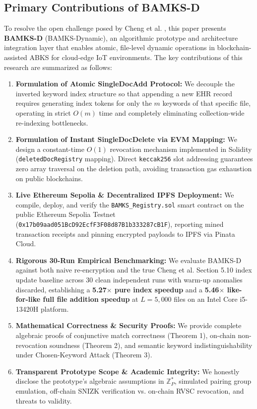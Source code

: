 \documentclass[journal,10pt,twocolumn]{IEEEtran}
\begin{document}
\subsection{Primary Contributions of BAMKS-D}
To resolve the open challenge posed by Cheng et al. \cite{cheng2026bamks}, this paper presents \textbf{BAMKS-D} (BAMKS-Dynamic), an algorithmic prototype and architecture integration layer that enables atomic, file-level dynamic operations in blockchain-assisted ABKS for cloud-edge IoT environments. The key contributions of this research are summarized as follows:
\begin{enumerate}
    \item \textbf{Formulation of Atomic SingleDocAdd Protocol:} We decouple the inverted keyword index structure so that appending a new EHR record requires generating index tokens for only the $m$ keywords of that specific file, operating in strict $O(m)$ time and completely eliminating collection-wide re-indexing bottlenecks.
    \item \textbf{Formulation of Instant SingleDocDelete via EVM Mapping:} We design a constant-time $O(1)$ revocation mechanism implemented in Solidity (\texttt{deletedDocRegistry} mapping). Direct \texttt{keccak256} slot addressing guarantees zero array traversal on the deletion path, avoiding transaction gas exhaustion on public blockchains.
    \item \textbf{Live Ethereum Sepolia \& Decentralized IPFS Deployment:} We compile, deploy, and verify the \texttt{BAMKS\_Registry.sol} smart contract on the public Ethereum Sepolia Testnet (\texttt{0x17b09aad051BcD92EcfF3F08d87B1b333287cB1F}), reporting mined transaction receipts and pinning encrypted payloads to IPFS via Pinata Cloud.
    \item \textbf{Rigorous 30-Run Empirical Benchmarking:} We evaluate BAMKS-D against both naive re-encryption and the true Cheng et al. Section 5.10 index update baseline across 30 clean independent runs with warm-up anomalies discarded, establishing a \textbf{5.27$\times$ pure index speedup} and a \textbf{5.46$\times$ like-for-like full file addition speedup} at $L = 5,000$ files on an Intel Core i5-13420H platform.
    \item \textbf{Mathematical Correctness \& Security Proofs:} We provide complete algebraic proofs of conjunctive match correctness (Theorem 1), on-chain non-revocation soundness (Theorem 2), and semantic keyword indistinguishability under Chosen-Keyword Attack (Theorem 3).
    \item \textbf{Transparent Prototype Scope \& Academic Integrity:} We honestly disclose the prototype's algebraic assumptions in $\mathbb{Z}_P^*$, simulated pairing group emulation, off-chain SNIZK verification vs. on-chain RVSC revocation, and threats to validity.
\end{enumerate}
\end{document}
